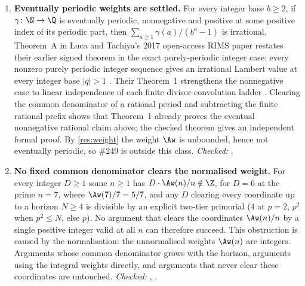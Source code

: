 {\begin{enumerate}[label=\textbf{R\arabic*.},ref=R\arabic*,leftmargin=2.4em,
  itemsep=0.2em,topsep=0.25em]
\item\label{res:periodic} 
\textbf{Eventually periodic weights are settled.}  For every integer base
$b\ge2$, if $\gamma\colon\N\to\Q$ is eventually periodic, nonnegative and
positive at some positive index of its periodic part, then
  $\sum_{a\ge1}\gamma(a)/(b^a-1)$ is irrational.  Theorem~A in Luca and
  Tachiya's 2017 open-access RIMS paper restates their earlier signed theorem in the exact
  purely-periodic integer case: every nonzero purely periodic integer sequence
  gives an irrational Lambert value at every integer base $|q|>1$
  \cite[Theorem~A, p.~139]{lucatachiya2017}.  Their Theorem~1 strengthens the
  nonnegative case to linear independence of each finite divisor-convolution
  ladder \cite[Theorem~1, p.~139; proof pp.~149--150]{lucatachiya2017}.
  Clearing the common denominator of a rational period and subtracting the
  finite rational prefix shows that Theorem~1 already proves the eventual
  nonnegative rational claim above; the checked theorem gives an independent
  formal proof.  By \ref{res:weight} the weight $\Aw$ is
unbounded, hence not eventually periodic, so \#249 is outside this class.
{\footnotesize\emph{Checked:}
.}

\item\label{res:primindex} 
\textbf{No fixed common denominator clears the normalised weight.}  For every integer
$D\ge1$ some $n\ge1$ has $D\cdot\Aw(n)/n\notin\Z$, for $D=6$ at the prime
$n=7$, where $\Aw(7)/7=5/7$, and any $D$ clearing every coordinate up to a
horizon $N\ge4$ is divisible by an explicit two-tier primorial ($4$ at $p=2$,
$p^2$ when $p^2\le N$, else $p$).  No argument that clears the coordinates
$\Aw(n)/n$ by a single positive integer valid at all $n$ can therefore
succeed.  This obstruction is caused by the normalisation: the unnormalised
weights $\Aw(n)$ are integers.  Arguments whose common denominator grows with
the horizon, arguments using the integral weights directly, and arguments
that never clear these coordinates are untouched.
{\footnotesize\emph{Checked:}
,
.}


\end{enumerate}}
